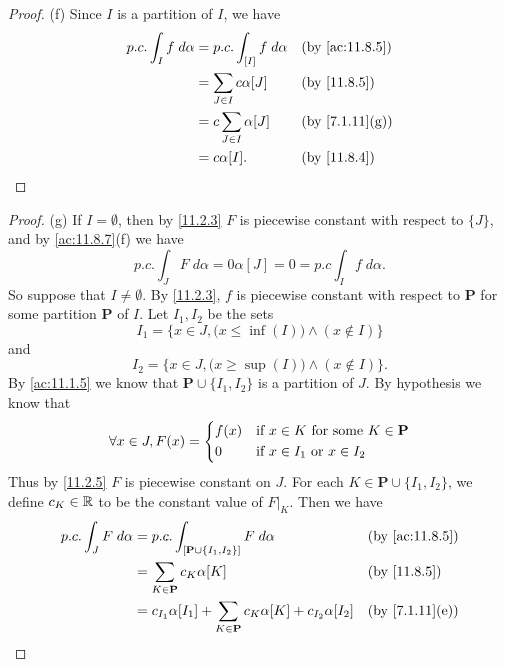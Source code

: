 \begin{proof}{(f)}
  Since \(I\) is a partition of \(I\), we have
  \begin{align*}
    p.c. \int_I f \; d \alpha & = p.c. \int_{[I]} f \; d \alpha &  & \text{(by \cref{ac:11.8.5})} \\
                              & = \sum_{J \in I} c \alpha[J]    &  & \text{(by \cref{11.8.5})}    \\
                              & = c \sum_{J \in I} \alpha[J]    &  & \text{(by \cref{7.1.11}(g))} \\
                              & = c \alpha[I].                  &  & \text{(by \cref{11.8.4})}
  \end{align*}
\end{proof}

\begin{proof}{(g)}
  If \(I = \emptyset\), then by \cref{11.2.3} \(F\) is piecewise constant with respect to \(\{J\}\), and by \cref{ac:11.8.7}(f) we have
  \[
    p.c. \int_J F \; d \alpha = 0 \alpha[J] = 0 = p.c \int_I f \; d \alpha.
  \]
  So suppose that \(I \neq \emptyset\).
  By \cref{11.2.3}, \(f\) is piecewise constant with respect to \(\mathbf{P}\) for some partition \(\mathbf{P}\) of \(I\).
  Let \(I_1, I_2\) be the sets
  \[
    I_1 = \Big\{x \in J, \big(x \leq \inf(I)\big) \land (x \notin I)\Big\}
  \]
  and
  \[
    I_2 = \Big\{x \in J, \big(x \geq \sup(I)\big) \land (x \notin I)\Big\}.
  \]
  By \cref{ac:11.1.5} we know that \(\mathbf{P} \cup \{I_1, I_2\}\) is a partition of \(J\).
  By hypothesis we know that
  \[
    \forall x \in J, F(x) = \begin{dcases}
      f(x) & \text{if } x \in K \text{ for some } K \in \mathbf{P} \\
      0    & \text{if } x \in I_1 \text{ or } x \in I_2
    \end{dcases}
  \]
  Thus by \cref{11.2.5} \(F\) is piecewise constant on \(J\).
  For each \(K \in \mathbf{P} \cup \{I_1, I_2\}\), we define \(c_K \in \mathbb{R}\) to be the constant value of \(F|_K\).
  Then we have
  \begin{align*}
    p.c. \int_J F \; d \alpha & = p.c. \int_{[\mathbf{P} \cup \{I_1, I_2\}]} F \; d \alpha                          &  & \text{(by \cref{ac:11.8.5})} \\
                              & = \sum_{K \in \mathbf{P}} c_K \alpha[K]                                             &  & \text{(by \cref{11.8.5})}    \\
                              & = c_{I_1} \alpha[I_1] + \sum_{K \in \mathbf{P}} c_K \alpha[K] + c_{I_2} \alpha[I_2] &  & \text{(by \cref{7.1.11}(e))} \\

\end{align*}
\end{proof}
